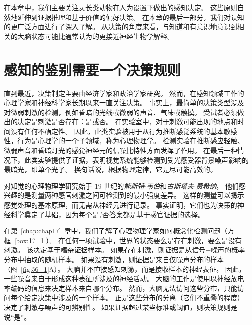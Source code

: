 在本章中，我们主要关注灵长类动物在人为设置下做出的感知决定。
这些原则自然地延伸到证据推理和基于价值的偏好决策。
在本章的最后一部分，我们对认知的更广泛方面进行了深入了解。
从决策的角度来看，与知道和有意识地意识到相关的大脑状态可能比通常认为的更接近神经生物学解释。



\section{感知的鉴别需要一个决策规则}

直到最近，决策制定主要由经济学家和政治学家研究。
然而，在感知领域工作的心理学家和神经科学家长期以来一直关注决策。
事实上，最简单的决策类型涉及对微弱刺激的检测，例如昏暗的光线或微弱的声音、气味或触摸。
受试者必须做出的决定是刺激是否存在：是或否。
在实验室中，对于刺激可能出现的地点和时间没有任何不确定性。
因此，此类实验被用于从行为推断感觉系统的基本敏感性，行为是心理学的一个子领域，称为心理物理学。
检测实验在推断感应轻触、微弱声音和昏暗灯光的感觉神经元的信噪比特性方面发挥了作用。
在最后一种情况下，此类实验提供了证据，表明视觉系统能够检测到受光感受器背景噪声影响的最暗光，即单个光子。
换句话说，根据物理定律，它是尽可能高效的。


对知觉的心理物理学研究始于 19 世纪的\textit{能斯特$\cdot$韦伯}和\textit{古斯塔夫$\cdot$费希纳}。
他们感兴趣的是测量两种感官刺激之间可检测到的最小强度差异。
这样的测量可以揭示感觉处理的基本原理，而无需从神经元进行记录。
事实证明，它们也为决策的神经科学奠定了基础，因为每个是/否答案都是基于感官证据的选择。


在第~\ref{chap:chap17}~章中，我们了解了心理物理学家如何概念化检测问题（方框~\ref{box:17_1}）。
在任何一项试验中，世界的状态要么是存在刺激，要么是没有刺激。
该决定基于嘈杂证据样本。
如果存在刺激，则证据是从信号+噪声的概率分布中抽取的随机样本。
如果没有刺激，则证据是来自仅噪声分布的样本（图~\ref{fig:56_1}A）。
大脑并不直接感知刺激，而是接收样本的神经表征。
因此，一些噪音来自于形成这种表征所涉及的神经活动。
大脑的工作是使用以神经放电率编码的信息来决定样本来自哪个分布。
然而，大脑无法访问这些分布，只能访问每个给定决策中涉及的一个样本。
正是这些分布的分离（它们不重叠的程度）决定了刺激与噪声的可辨别性。
如果证据超过某些标准或阈值，则决策规则是说“是”。


